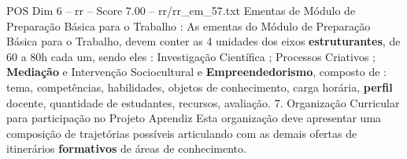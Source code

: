 \begin{textsample}{POS Dim 6 – rr – Score 7.00 – rr/rr\_em\_57.txt}
Ementas de Módulo de Preparação Básica para o Trabalho : As ementas do Módulo de Preparação Básica para o Trabalho, devem conter as 4 unidades dos eixos \textbf{estruturantes}, de 60 a 80h cada um, sendo eles : Investigação Científica ; Processos Criativos ; \textbf{Mediação} e Intervenção Sociocultural e \textbf{Empreendedorismo}, composto de : tema, competências, habilidades, objetos de conhecimento, carga horária, \textbf{perfil} docente, quantidade de estudantes, recursos, avaliação. 7.
Organização Curricular para participação no Projeto Aprendiz Esta organização deve apresentar uma composição de trajetórias possíveis articulando com as demais ofertas de itinerários \textbf{formativos} de áreas de conhecimento.

\end{textsample}

